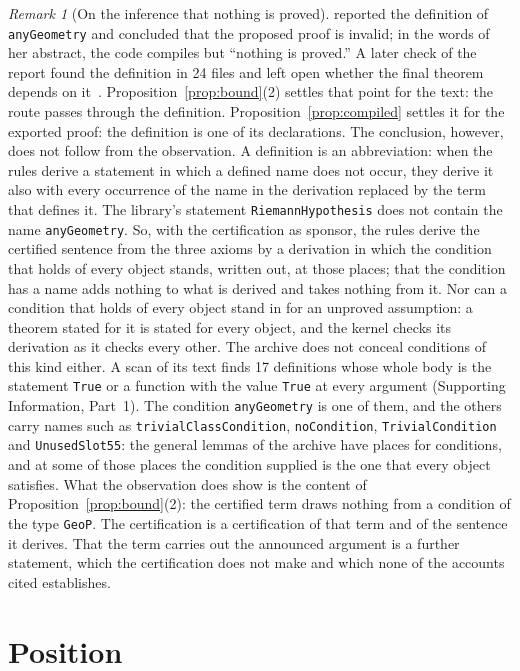 \documentclass[11pt]{article}
\theoremstyle{definition}
\theoremstyle{remark}
\newtheorem{remark}[theorem]{Remark}
\DeclareRobustCommand{\lean}[1]{{\renewcommand{\_}{\textunderscore\allowbreak}\texttt{#1}}}
\newcommand{\True}{\lean{True}}
\begin{document}
\begin{remark}[On the inference that nothing is proved]\label{rem:nothing}
\citet{nielsen} reported the definition of \lean{anyGeometry} and concluded that the proposed proof is invalid; in the words of her abstract, the code compiles but ``nothing is proved.'' A later check of the report found the definition in 24 files and left open whether the final theorem depends on it~\citep{chu}. Proposition~\ref{prop:bound}(2) settles that point for the text: the route passes through the definition. Proposition~\ref{prop:compiled} settles it for the exported proof: the definition is one of its declarations. The conclusion, however, does not follow from the observation. A definition is an abbreviation: when the rules derive a statement in which a defined name does not occur, they derive it also with every occurrence of the name in the derivation replaced by the term that defines it. The library's statement \lean{RiemannHypothesis} does not contain the name \lean{anyGeometry}. So, with the certification as sponsor, the rules derive the certified sentence from the three axioms by a derivation in which the condition that holds of every object stands, written out, at those places; that the condition has a name adds nothing to what is derived and takes nothing from it. Nor can a condition that holds of every object stand in for an unproved assumption: a theorem stated for it is stated for every object, and the kernel checks its derivation as it checks every other. The archive does not conceal conditions of this kind either. A scan of its text finds 17 definitions whose whole body is the statement \True{} or a function with the value \True{} at every argument (Supporting Information, Part~1). The condition \lean{anyGeometry} is one of them, and the others carry names such as \lean{trivialClassCondition}, \lean{noCondition}, \lean{TrivialCondition} and \lean{UnusedSlot55}: the general lemmas of the archive have places for conditions, and at some of those places the condition supplied is the one that every object satisfies. What the observation does show is the content of Proposition~\ref{prop:bound}(2): the certified term draws nothing from a condition of the type \lean{GeoP}. The certification is a certification of that term and of the sentence it derives. That the term carries out the announced argument is a further statement, which the certification does not make and which none of the accounts cited establishes.
\end{remark}


\section{Position}\label{sec:position}
\end{document}
